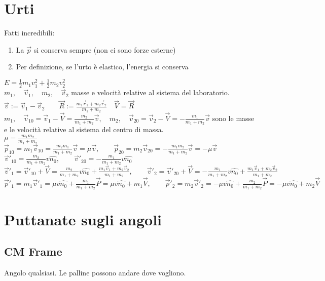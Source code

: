 \documentclass[a4paper,NoNotes,GeneralMath,12pt]{stdmdoc}
\begin{document}
	\section*{Urti}
	Fatti incredibili:
	\begin{enumerate}
		\item La $\vec{p}$ si conserva sempre (non ci sono forze esterne)
		\item Per definizione, se l'urto è elastico, l'energia si conserva
	\end{enumerate}
	$E = \frac{1}{2} m_1 v_1^2 + \frac{1}{2} m_2 v_2^2$ \\
	$m_1, \quad \vec{v}_1, \quad m_2, \quad \vec{v}_2$ masse e velocità relative al sistema del laboratorio. \\
	$\vec{v} := \vec{v}_1 - \vec{v}_2 \qquad \vec{R} := \frac{m_1\vec{r}_1 + m_2\vec{r}_2}{m_1 + m_2} \quad \vec{V} = \dot{\vec{R}}$ \\
	$m_1, \quad \vec{v}_{10} = \vec{v}_1 - \vec{V} = \frac{m_2}{m_1 + m_2} \vec{v}, \quad m_2, \quad \vec{v}_{20} = \vec{v}_2 - \vec{V} = -\frac{m_1}{m_1 + m_2} \vec{v}$ sono le masse e le velocità relative al sistema del centro di massa. \\
	$\mu = \frac{m_1m_2}{m_1+m_2}$ \\
	$\vec{p}_{10} = m_1 \vec{v}_{10} = \frac{m_2m_1}{m_1 + m_2} \vec{v} = \mu \vec{v}, \qquad \vec{p}_{20} = m_2 \vec{v}_{20} = -\frac{m_1m_2}{m_1 + m_2} \vec{v} = - \mu \vec{v}$\\
	$\vec{v}'_{10} = \frac{m_2}{m_1 + m_2} v \hat{n_0}, \qquad \vec{v}'_{20} = - \frac{m_1}{m_1 + m_2} v \hat{n_0}$ \\
	$\vec{v}'_1 = \vec{v}'_{10} + \vec{V} = \frac{m_2}{m_1 + m_2} v \hat{n_0} + \frac{m_1\vec{v}_1 + m_2 \vec{v}_2}{m_1 + m_2}, \qquad \vec{v}'_2 = \vec{v}'_{20} + \vec{V} = - \frac{m_1}{m_1 + m_2} v \hat{n_0} + \frac{m_1\vec{v}_1 + m_2\vec{v}_2}{m_1 + m_2}$ \\
	$\vec{p}'_1 = m_1\vec{v}'_1 = \mu v \hat{n_0} + \frac{m_1}{m_1 + m_2} \vec{P} = \mu v \hat{n_0} + m_1 \vec{V}, \qquad \vec{p}'_2 = m_2 \vec{v}'_2 = - \mu v \hat{n_0} + \frac{m_2}{m_1+m_2} \vec{P} = - \mu v \hat{n_0} + m_2 \vec{V}$

	\section*{Puttanate sugli angoli}
	\subsection*{CM Frame}
	Angolo qualsiasi. Le palline possono andare dove vogliono.
\end{document}

